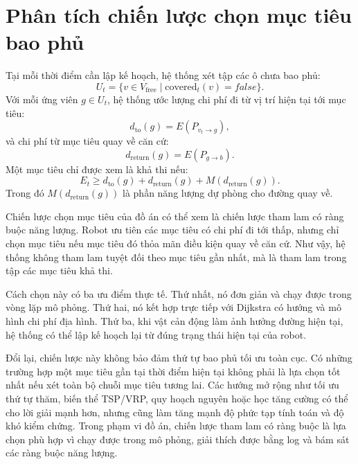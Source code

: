 \documentclass[../DoAn.tex]{subfiles}
\begin{document}
\section{Phân tích chiến lược chọn mục tiêu bao phủ}

Tại mỗi thời điểm cần lập kế hoạch, hệ thống xét tập các ô chưa bao phủ:
\begin{equation}
U_t=\{v\in V_{\text{free}}\mid \text{covered}_t(v)=false\}.
\end{equation}
Với mỗi ứng viên $g\in U_t$, hệ thống ước lượng chi phí đi từ vị trí hiện tại tới mục tiêu:
\begin{equation}
d_{\text{to}}(g)=E(P_{v_t\rightarrow g}),
\end{equation}
và chi phí từ mục tiêu quay về căn cứ:
\begin{equation}
d_{\text{return}}(g)=E(P_{g\rightarrow b}).
\end{equation}
Một mục tiêu chỉ được xem là khả thi nếu:
\begin{equation}
E_t \ge d_{\text{to}}(g)+d_{\text{return}}(g)+M(d_{\text{return}}(g)).
\end{equation}
Trong đó $M(d_{\text{return}}(g))$ là phần năng lượng dự phòng cho đường quay về.

Chiến lược chọn mục tiêu của đồ án có thể xem là chiến lược tham lam có ràng buộc năng lượng. Robot ưu tiên các mục tiêu có chi phí đi tới thấp, nhưng chỉ chọn mục tiêu nếu mục tiêu đó thỏa mãn điều kiện quay về căn cứ. Như vậy, hệ thống không tham lam tuyệt đối theo mục tiêu gần nhất, mà là tham lam trong tập các mục tiêu khả thi.

Cách chọn này có ba ưu điểm thực tế. Thứ nhất, nó đơn giản và chạy được trong vòng lặp mô phỏng. Thứ hai, nó kết hợp trực tiếp với Dijkstra có hướng và mô hình chi phí địa hình. Thứ ba, khi vật cản động làm ảnh hưởng đường hiện tại, hệ thống có thể lập kế hoạch lại từ đúng trạng thái hiện tại của robot.

Đổi lại, chiến lược này không bảo đảm thứ tự bao phủ tối ưu toàn cục. Có những trường hợp một mục tiêu gần tại thời điểm hiện tại không phải là lựa chọn tốt nhất nếu xét toàn bộ chuỗi mục tiêu tương lai. Các hướng mở rộng như tối ưu thứ tự thăm, biến thể TSP/VRP, quy hoạch nguyên hoặc học tăng cường có thể cho lời giải mạnh hơn, nhưng cũng làm tăng mạnh độ phức tạp tính toán và độ khó kiểm chứng. Trong phạm vi đồ án, chiến lược tham lam có ràng buộc là lựa chọn phù hợp vì chạy được trong mô phỏng, giải thích được bằng log và bám sát các ràng buộc năng lượng.
\end{document}
